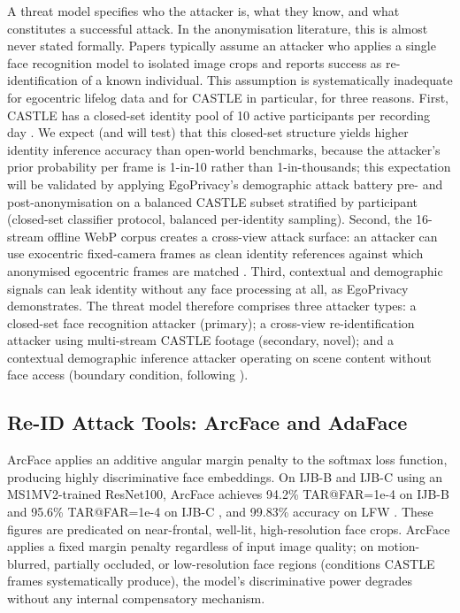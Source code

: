 \documentclass[12pt, onecolumn]{IEEEtran}
\begin{document}
A threat model specifies who the attacker is, what they know, and what
constitutes a successful attack. In the anonymisation literature, this
is almost never stated formally. Papers typically assume an attacker who
applies a single face recognition model to isolated image crops and
reports success as re-identification of a known individual. This
assumption is systematically inadequate for egocentric lifelog data and
for CASTLE in particular, for three reasons. First, CASTLE has a
closed-set identity pool of 10 active participants per recording day
\cite{rossetto2025castle}. We expect (and will test) that this
closed-set structure yields higher identity inference accuracy than
open-world benchmarks, because the attacker's prior probability per
frame is 1-in-10 rather than 1-in-thousands; this expectation will be
validated by applying EgoPrivacy's demographic attack battery pre- and
post-anonymisation on a balanced CASTLE subset stratified by participant
(closed-set classifier protocol, balanced per-identity sampling).
Second, the 16-stream offline WebP corpus creates a cross-view attack
surface: an attacker can use exocentric fixed-camera frames as clean
identity references against which anonymised egocentric frames are
matched \cite{rossetto2025castle}. Third, contextual and demographic
signals can leak identity without any face processing at all, as
EgoPrivacy \cite{li2025egoprivacy} demonstrates. The threat model
therefore comprises three attacker types: a closed-set face recognition
attacker (primary); a cross-view re-identification attacker using
multi-stream CASTLE footage (secondary, novel); and a contextual
demographic inference attacker operating on scene content without face
access (boundary condition, following \cite{li2025egoprivacy}).

\subsection{Re-ID Attack Tools: ArcFace and AdaFace}

ArcFace \cite{deng2019arcface} applies an additive angular margin
penalty to the softmax loss function, producing highly discriminative
face embeddings. On IJB-B and IJB-C using an MS1MV2-trained ResNet100,
ArcFace achieves 94.2\% TAR@FAR=1e-4 on IJB-B and 95.6\% TAR@FAR=1e-4 on
IJB-C \cite{deng2019arcface}, and 99.83\% accuracy on LFW
\cite{deng2019arcface}. These figures are predicated on near-frontal,
well-lit, high-resolution face crops. ArcFace applies a fixed margin
penalty regardless of input image quality; on motion-blurred, partially
occluded, or low-resolution face regions (conditions CASTLE frames
systematically produce), the model's discriminative power degrades
without any internal compensatory mechanism.
\end{document}

